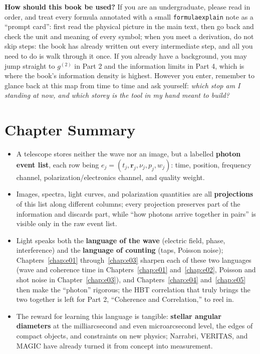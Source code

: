 \textbf{How should this book be used?} If you are an undergraduate, please read in order, and treat every formula annotated with a small \verb|formulaexplain| note as a ``prompt card'': first read the physical picture in the main text, then go back and check the unit and meaning of every symbol; when you meet a derivation, do not skip steps: the book has already written out every intermediate step, and all you need to do is walk through it once. If you already have a background, you may jump straight to \(g^{(2)}\) in Part 2 and the information limits in Part 4, which is where the book's information density is highest. However you enter, remember to glance back at this map from time to time and ask yourself: \emph{which stop am I standing at now, and which storey is the tool in my hand meant to build?}

\section{Chapter Summary}
\label{sec:e00-summary}

\begin{itemize}
  \item A telescope stores neither the wave nor an image, but a labelled \textbf{photon event list}, each row being \(e_j=(t_j,\bm r_j,\nu_j,p_j,w_j)\): time, position, frequency channel, polarization/electronics channel, and quality weight.
  \item Images, spectra, light curves, and polarization quantities are all \textbf{projections} of this list along different columns; every projection preserves part of the information and discards part, while ``how photons arrive together in pairs'' is visible only in the raw event list.
  \item Light speaks both the \textbf{language of the wave} (electric field, phase, interference) and the \textbf{language of counting} (taps, Poisson noise); Chapters~\ref{chap:e01} through~\ref{chap:e03} sharpen each of these two languages (wave and coherence time in Chapters~\ref{chap:e01} and~\ref{chap:e02}, Poisson and shot noise in Chapter~\ref{chap:e03}), and Chapters~\ref{chap:e04} and~\ref{chap:e05} then make the ``photon'' rigorous; the HBT correlation that truly brings the two together is left for Part 2, ``Coherence and Correlation,'' to reel in.
  \item The reward for learning this language is tangible: \textbf{stellar angular diameters} at the milliarcsecond and even microarcsecond level, the edges of compact objects, and constraints on new physics; Narrabri, VERITAS, and MAGIC have already turned it from concept into measurement.
\end{itemize}


